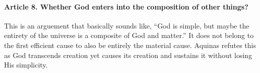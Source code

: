 \documentclass{ucetd}
\begin{document}

\paragraph{Article 8. Whether God enters into the composition of other things?}
This is an arguement that basically sounds like, ``God is simple, but maybe the entirety of the universe is a composite of God and matter.'' It does not belong to the first efficient cause to also be entirely the material cause. Aquinas refutes this as God transcends creation yet causes its creation and sustains it without losing His simplicity. 
\end{document}
